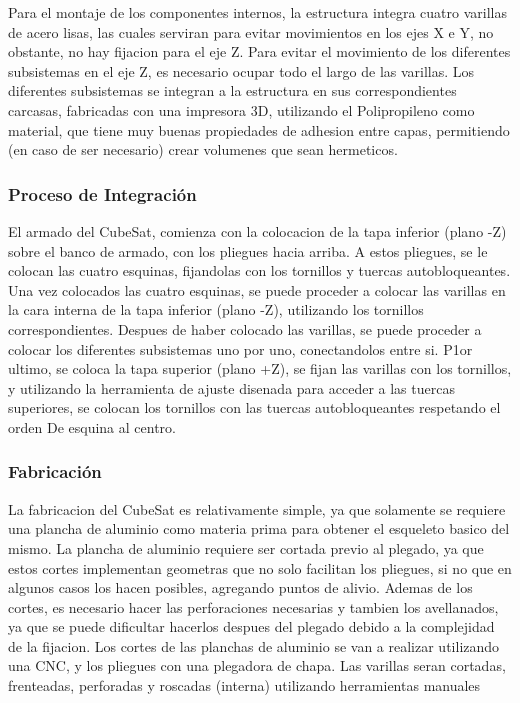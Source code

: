       Para el montaje de los componentes internos, la estructura integra cuatro varillas de
      acero lisas, las cuales serviran para evitar movimientos en los ejes X e Y, no obstante, no hay
      fijacion para el eje Z. Para evitar el movimiento de los diferentes subsistemas en el eje Z, es
      necesario ocupar todo el largo de las varillas.
      Los diferentes subsistemas se integran a la estructura en sus correspondientes carcasas,
      fabricadas con una impresora 3D, utilizando el Polipropileno como material, que tiene muy
      buenas propiedades de adhesion entre capas, permitiendo (en caso de ser necesario) crear
      volumenes que sean hermeticos.

    \subsubsection{Proceso de Integración}

      El armado del CubeSat, comienza con la colocacion de la tapa inferior (plano -Z) sobre
      el banco de armado, con los pliegues hacia arriba. A estos pliegues, se le colocan las cuatro
      esquinas, fijandolas con los tornillos y tuercas autobloqueantes. Una vez colocados las cuatro
      esquinas, se puede proceder a colocar las varillas en la cara interna de la tapa inferior (plano
      -Z), utilizando los tornillos correspondientes. Despues de haber colocado las varillas, se puede
      proceder a colocar los diferentes subsistemas uno por uno, conectandolos entre si. P1or ultimo,
      se coloca la tapa superior (plano +Z), se fijan las varillas con los tornillos, y utilizando la
      herramienta de ajuste disenada para acceder a las tuercas superiores, se colocan los tornillos
      con las tuercas autobloqueantes respetando el orden De esquina al centro.

    \subsubsection{Fabricación}

      La fabricacion del CubeSat es relativamente simple, ya que solamente se requiere una
      plancha de aluminio como materia prima para obtener el esqueleto basico del mismo. La
      plancha de aluminio requiere ser cortada previo al plegado, ya que estos cortes implementan
      geometras que no solo facilitan los pliegues, si no que en algunos casos los hacen posibles,
      agregando puntos de alivio. Ademas de los cortes, es necesario hacer las perforaciones necesarias y tambien los avellanados, ya que se puede dificultar hacerlos despues del plegado
      debido a la complejidad de la fijacion.
      Los cortes de las planchas de aluminio se van a realizar utilizando una CNC, y los pliegues
      con una plegadora de chapa.
      Las varillas seran cortadas, frenteadas, perforadas y roscadas (interna) utilizando herramientas manuales

